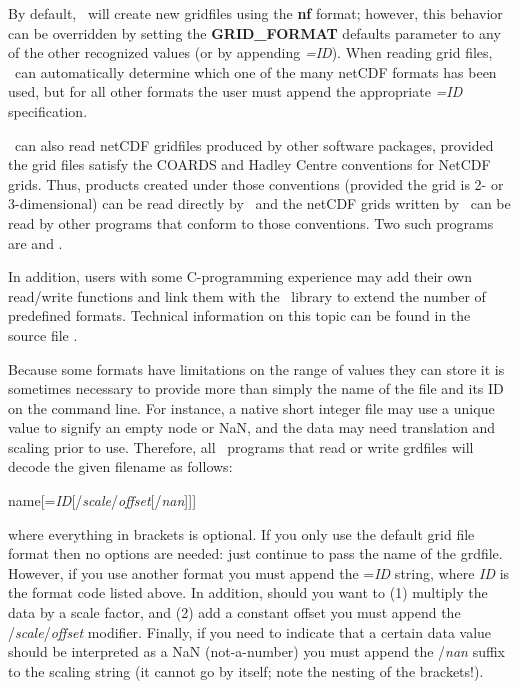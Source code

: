 By default, \GMT\ will create new gridfiles using the \textbf{nf} format; however,
this behavior can be overridden by setting the \textbf{GRID\_FORMAT} defaults parameter
to any of the other recognized values (or by appending \emph{=ID}).
When reading grid files, \GMT\ can automatically
determine which one of the many netCDF formats has been used, but for all other formats
the user must append the appropriate \emph{=ID} specification.

\GMT\ can also read netCDF gridfiles produced by other software packages, provided the grid files
satisfy the COARDS and Hadley Centre conventions for NetCDF grids. Thus, products created under
those conventions (provided the grid is 2- or 3-dimensional) can be read directly by \GMT\ and the netCDF grids
written by \GMT\ can be read by other programs that conform to those conventions. Two such programs are
and
.

In addition, users with some C-programming experience may add
their own read/write functions and link them with the \GMT\ library
to extend the number of predefined formats.  Technical information
on this topic can be found in the source file . 

Because some formats have limitations on the range of values they can store
it is sometimes necessary to provide more
than simply the name of the file and its ID on the command line.  For instance,
a native short integer file may use a unique value to signify an empty node
or NaN, and the data may need translation and scaling prior to use.
Therefore, all \GMT\ programs that read or write grdfiles will decode
the given filename as follows:

\vspace{\baselineskip} 

\par 	name[=\emph{ID}[/\emph{scale}/\emph{offset}[/\emph{nan}]]]\par 

\vspace{\baselineskip} 

\noindent
where everything in brackets is optional.  If you only use the default
grid file format then no options are needed: just continue to pass
the name of the grdfile.  However, if you use another format you must
append the =\emph{ID} string, where \emph{ID} is the format code
listed above.  In addition, should you want to (1) multiply the data by
a scale factor, and (2) add a constant offset you must append the
/\emph{scale}/\emph{offset} modifier.  Finally, if you need to indicate
that a certain data value should be interpreted as a NaN (not-a-number)
you must append the /\emph{nan} suffix to the scaling string (it cannot
go by itself; note the nesting of the brackets!). 

